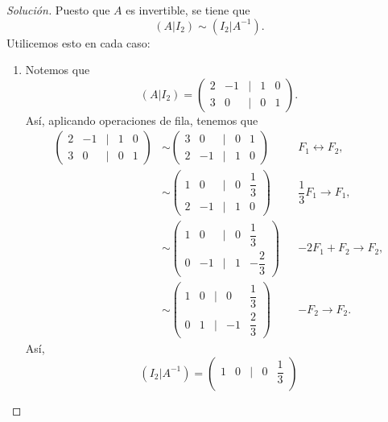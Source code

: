 \documentclass[a4,11pt]{aleph-notas}
\begin{document}
\begin{proof}[Solución]\hspace{0pt}
    Puesto que $A$ es invertible, se tiene que 
    \[
        (A|I_2)\sim (I_2|A^{-1}).
    \]
    Utilicemos esto en cada caso:
    \begin{enumerate}
        \item Notemos que 
        \[
           (A|I_2) =  \begin{pmatrix}
                2 & -1 & | & 1 & 0\\ 3 & 0 & | & 0 & 1
            \end{pmatrix}.
        \]
            Así, aplicando operaciones de fila, tenemos que 
        \begin{align*}
            \begin{pmatrix}
                2 & -1 & | & 1 & 0\\[0.75em]
                3 & 0 & | & 0 & 1
            \end{pmatrix}& \sim \begin{pmatrix}
                3 & 0 & | & 0 & 1 \\[0.75em]
                2 & -1 & | & 1 & 0
            \end{pmatrix} && F_1 \leftrightarrow F_2,  \\[0.25em]
            &\sim \begin{pmatrix}
                1 & 0 & | & 0 & \dfrac{1}{3} \\[0.75em]
                2 & -1 & | & 1 & 0
            \end{pmatrix} && \dfrac{1}{3}F_1 \rightarrow F_1, \\[0.25em]
            & \sim \begin{pmatrix}
                1 & 0 & | & 0 & \dfrac{1}{3} \\[0.75em]
                0 & -1 & | & 1 & -\dfrac{2}{3}
            \end{pmatrix} && - 2 F_1 + F_2  \rightarrow F_2, \\[0.25em]
            & \sim \begin{pmatrix}
                1 & 0 & | & 0 & \dfrac{1}{3} \\[0.75em]
                0 & 1 & | & -1 & \dfrac{2}{3}
            \end{pmatrix} && -F_2 \rightarrow F_2.
        \end{align*}
        Así, 
        \[
            (I_2|A^{-1}) = \begin{pmatrix}
                1 & 0 & | & 0 & \dfrac{1}{3} \\[0.75em]

\end{pmatrix}\]
\end{enumerate}
\end{proof}
\end{document}
